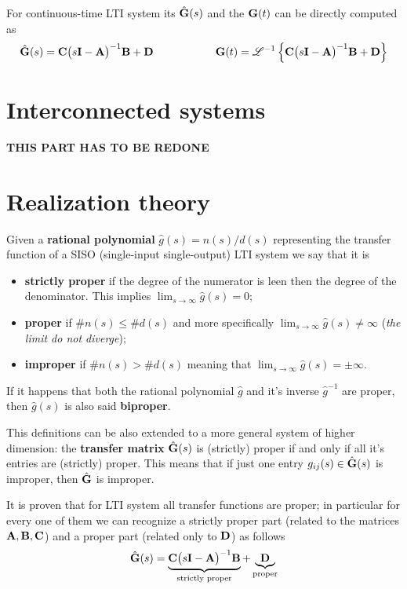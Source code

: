 	\begin{theorem}
		For continuous-time LTI system its  $\hat {\mathbf{G}}(s)$ and the  $\mathbf{G}(t)$ can be directly computed as
		\begin{equation}
			\hat {\mathbf{G}}(s) = \mathbf{C} \big(s\mathbf{I} - \mathbf{A} \big)^{-1}\mathbf{B} + \mathbf{D} \hspace{2cm} \mathbf{G}(t) = \mathscr L^{-1}\left\{  \mathbf{C} \big(s\mathbf{I} - \mathbf{A} \big)^{-1}\mathbf{B} + \mathbf{D} \right\} 
		\end{equation}
	\end{theorem}

\section{Interconnected systems}
	\textbf{THIS PART HAS TO BE REDONE}
	
\section{Realization theory}
	Given a \textbf{rational polynomial} $\hat g(s) = n(s)/d(s)$ representing the transfer function of a SISO (single-input single-output) LTI system we say that it is\\
	\begin{itemize}
		\item \textbf{strictly proper} if the degree of the numerator is leen then the degree of the denominator. This implies $\lim_{s\rightarrow \infty} \hat g(s) = 0$;
		\item \textbf{proper} if $\#n(s) \leq \#d(s)$ and more specifically $\lim_{s\rightarrow \infty}\hat g(s) \neq \infty$ (\textit{the limit do not diverge});
		\item \textbf{improper} if $\#n(s) > \#d(s)$ meaning that $\lim_{s\rightarrow \infty} \hat g(s) = \pm \infty$.
	\end{itemize}
	If it happens that both the rational polynomial $\hat g$ and it's inverse $\hat g^{-1}$ are proper, then $\hat g(s)$ is also said \textbf{biproper}.
	
	This definitions can be also extended to a more general system of higher dimension: the \textbf{transfer matrix} $\hat{\mathbf{G}}(s)$ is (strictly) proper if and only if all it's entries are (strictly) proper. This means that if just one entry $g_{ij}(s) \in \hat{\mathbf{G}}(s)$ is improper, then $\hat {\mathbf{G}}$ is improper.
	
	It is proven that for LTI system all transfer functions are proper; in particular for every one of them we can recognize a strictly proper part (related to the matrices $\mathbf{A},\mathbf{B},\mathbf{C}$) and a proper part (related only to $\mathbf{D}$) as follows
	\begin{equation} \label{eq:dynsys:temp3}
		\hat {\mathbf{G}}(s) = \underbrace{\mathbf{C} \big(s\mathbf{I} - \mathbf{A} \big)^{-1}\mathbf{B}}_\textrm{strictly proper} + \underbrace{\mathbf{D}}_\textrm{proper}
	\end{equation}
	
